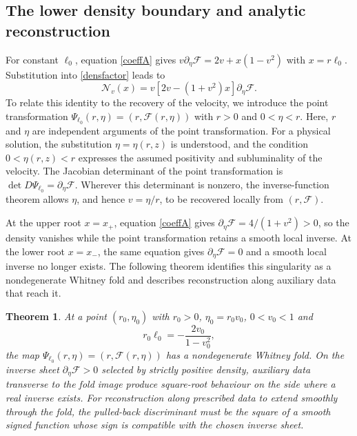 \documentclass[amsmath,amsfonts,amssymb,aps,pra,superscriptaddress,10pt]{revtex4-2}
\numberwithin{equation}{section}
\theoremstyle{plain}
\newtheorem{theorem}{Theorem}
\theoremstyle{definition}
\theoremstyle{remark}
\theoremstyle{definition}
\newcommand{\ellzero}{\ell_0}
\begin{document}
\subsection{The lower density boundary and analytic reconstruction}

For constant $\ellzero$, equation \eqref{coeffA} gives $v\partial_\eta\mathcal F=2v+x(1-v^2)$ with $x=r\ellzero$. Substitution into \eqref{densfactor} leads to
\begin{equation}\label{denfoldfactor}
\mathcal{N}_v(x)=v[2v-(1+v^2)x]\partial_\eta\mathcal{F}.
\end{equation}
To relate this identity to the recovery of the velocity, we introduce the point transformation $\Psi_{\ellzero}(r,\eta)
=\left(r,\mathcal{F}(r,\eta)\right)$ with $r>0$ and $0<\eta<r$. Here, $r$ and $\eta$ are independent arguments of the point transformation. For a physical solution, the substitution $\eta=\eta(r,z)$ is understood, and the condition $0<\eta(r,z)<r$ expresses the assumed positivity and subluminality of the velocity. The Jacobian determinant of the point transformation is $\det D\Psi_{\ellzero}=\partial_\eta\mathcal{F}$.  Wherever this determinant is nonzero, the inverse-function theorem allows $\eta$, and hence $v=\eta/r$, to be recovered locally from $(r,\mathcal{F})$. 

At the upper root $x=x_+$, equation \eqref{coeffA} gives $\partial_\eta\mathcal{F}=4/(1+v^2)>0$, so the density vanishes while the point transformation retains a smooth local inverse. At the lower root $x=x_-$, the same equation gives $\partial_\eta\mathcal{F}=0$ and a smooth local inverse no longer exists. The following theorem identifies this singularity as a nondegenerate Whitney fold and describes reconstruction along auxiliary data that reach it.

\begin{theorem}
At a point $(r_0,\eta_0)$ with $r_0>0$, $\eta_0=r_0v_0$, $0<v_0<1$ and
\begin{equation}
r_0\ellzero=-\frac{2v_0}{1-v_0^2},
\end{equation}
the map $\Psi_{\ellzero}(r,\eta)=(r,\mathcal{F}(r,\eta))$ has a nondegenerate Whitney fold. On the inverse sheet $\partial_\eta\mathcal{F}>0$ selected by strictly positive density, auxiliary data transverse to the fold image produce square-root behaviour on the side where a real inverse exists. For reconstruction along prescribed data to extend smoothly through the fold, the pulled-back discriminant must be the square of a smooth signed function whose sign is compatible with the chosen inverse sheet.
\end{theorem}
\end{document}
